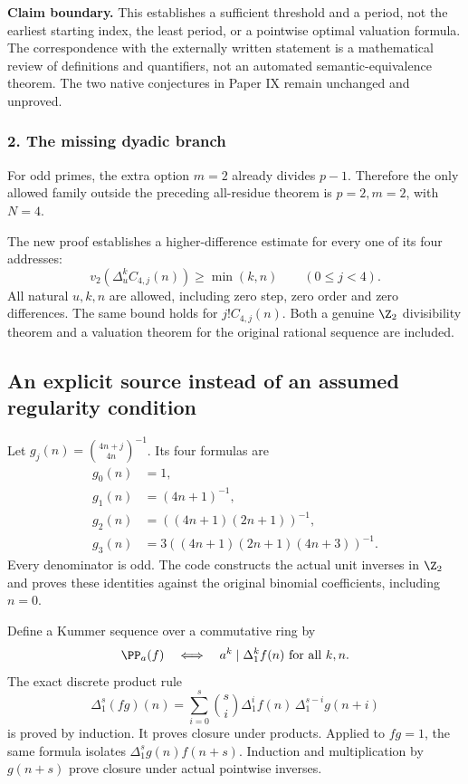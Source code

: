 \textbf{Claim boundary.} This establishes a sufficient threshold and a period, not the earliest starting index, the least period, or a pointwise optimal valuation formula. The correspondence with the externally written statement is a mathematical review of definitions and quantifiers, not an automated semantic-equivalence theorem. The two native conjectures in Paper IX remain unchanged and unproved.

\par\medskip
\subsubsection*{2. The missing dyadic branch}
For odd primes, the extra option $m=2$ already divides $p-1$. Therefore the only allowed family outside the preceding all-residue theorem is $p=2,m=2$, with $N=4$.

The new proof establishes a higher-difference estimate for every one of its four addresses:
\[
\boxed{v_2\!\left(\Delta_u^k C_{4,j}(n)\right)\ge\min(k,n)
       \qquad(0\le j<4).}
\]
All natural $u,k,n$ are allowed, including zero step, zero order and zero differences. The same bound holds for $j!C_{4,j}(n)$. Both a genuine $\Z_2$ divisibility theorem and a valuation theorem for the original rational sequence are included.

\subsection*{An explicit source instead of an assumed regularity condition}
Let $g_j(n)=\binom{4n+j}{4n}^{-1}$. Its four formulas are
\[
\begin{aligned}
 g_0(n)&=1,\\
 g_1(n)&=(4n+1)^{-1},\\
 g_2(n)&=((4n+1)(2n+1))^{-1},\\
 g_3(n)&=3((4n+1)(2n+1)(4n+3))^{-1}.
\end{aligned}
\]
Every denominator is odd. The code constructs the actual unit inverses in $\Z_2$ and proves these identities against the original binomial coefficients, including $n=0$.

Define a Kummer sequence over a commutative ring by
\[
\PP_a(f)\quad\Longleftrightarrow\quad
 a^k\mid\Delta_1^k f(n)\ \text{for all }k,n.
\]
The exact discrete product rule
\[
\Delta_1^s(fg)(n)=\sum_{i=0}^s\binom si
     \Delta_1^i f(n)\,\Delta_1^{s-i}g(n+i)
\]
is proved by induction. It proves closure under products. Applied to $fg=1$, the same formula isolates
$\Delta_1^s g(n)f(n+s)$. Induction and multiplication by $g(n+s)$ prove closure under actual pointwise inverses.

